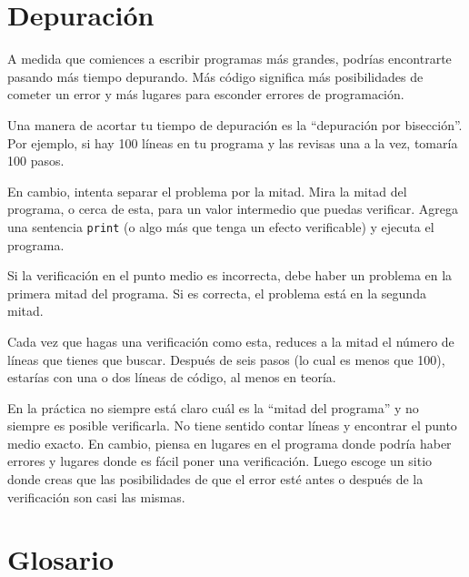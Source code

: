 \documentclass[10pt]{book}
\begin{document}
\section{Depuración}
\label{bisectbug}

A medida que comiences a escribir programas más grandes, podrías encontrarte
pasando más tiempo depurando.  Más código significa más posibilidades de
cometer un error y más lugares para esconder errores de programación.

Una manera de acortar tu tiempo de depuración es la ``depuración por bisección''.
Por ejemplo, si hay 100 líneas en tu programa y las
revisas una a la vez, tomaría 100 pasos.

En cambio, intenta separar el problema por la mitad.  Mira la mitad
del programa, o cerca de esta, para un valor intermedio que
puedas verificar.  Agrega una sentencia {\tt print} (o algo más
que tenga un efecto verificable) y ejecuta el programa.

Si la verificación en el punto medio es incorrecta, debe haber un problema en la
primera mitad del programa.  Si es correcta, el problema está
en la segunda mitad.

Cada vez que hagas una verificación como esta, reduces a la mitad el número
de líneas que tienes que buscar.  Después de seis pasos (lo cual es menos que 100),
estarías con una o dos líneas de código, al menos en teoría.

En la práctica no siempre está claro cuál es
la ``mitad del programa'' y no siempre es posible
verificarla.  No tiene sentido contar líneas y encontrar el
punto medio exacto.  En cambio, piensa en lugares
en el programa donde podría haber errores y lugares donde es
fácil poner una verificación.  Luego escoge un sitio donde
creas que las posibilidades de que el error esté antes o después
de la verificación son casi las mismas.




\section{Glosario}
\end{document}
